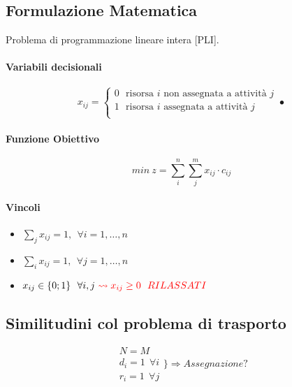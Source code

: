 \documentclass[12pt,a4paper]{article}
\begin{document}
\subsection{Formulazione Matematica}
Problema di programmazione lineare intera [PLI].
\paragraph{Variabili decisionali} $$x_{ij} = \begin{cases}
0 \ \ \ \text{risorsa $i$ non assegnata a attività $j$}\\
1 \ \ \ \text{risorsa $i$ assegnata a attività $j$}\\
\end{cases}•$$
\paragraph{Funzione Obiettivo} $$min\ z = \sum_i^n \sum_j^m x_{ij}\cdot c_{ij}$$
\paragraph{Vincoli} \begin{itemize}
\item $\sum_j x_{ij} = 1, \ \ \forall i = 1, \dots, n$
\item $\sum_i x_{ij} = 1, \ \ \forall j = 1, \dots, n$
\item $x_{ij} \in \{0;1\} \ \ \forall i, j \ \textcolor{red}{\leadsto x_{ij}\geq 0\ \ RILASSATI}$
\end{itemize}

\subsection{Similitudini col problema di trasporto}
$$\begin{array}{l}N=M\\d_i=1 \ \ \forall i\\r_i=1 \ \ \forall j\end{array} \Bigg\}\Rightarrow Assegnazione?$$
\end{document}

